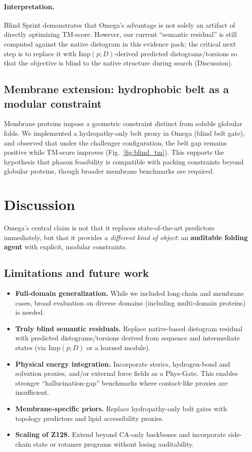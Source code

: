 \documentclass[10pt]{article}
\begin{document}
\paragraph{Interpretation.}
Blind Sprint demonstrates that Omega’s advantage is not solely an artifact of directly optimizing TM-score.
However, our current ``semantic residual'' is still computed against the native distogram in this evidence pack; the critical next step is to replace it with \(\mathrm{Imp}(p;D)\)-derived predicted distograms/torsions so that the objective is blind to the native structure during search (Discussion).

\subsection{Membrane extension: hydrophobic belt as a modular constraint}
Membrane proteins impose a geometric constraint distinct from soluble globular folds.
We implemented a hydropathy-only belt proxy in Omega (blind belt gate), and observed that under the challenger configuration, the belt gap remains positive while TM-score improves (Fig.~\ref{fig:blind_tm}).
This supports the hypothesis that phason feasibility is compatible with packing constraints beyond globular proteins, though broader membrane benchmarks are required.

\section{Discussion}
Omega’s central claim is not that it replaces state-of-the-art predictors immediately, but that it provides a \emph{different kind of object}: an \textbf{auditable folding agent} with explicit, modular constraints.

\subsection*{Limitations and future work}
\begin{itemize}[leftmargin=*]
\item \textbf{Full-domain generalization.} While we included long-chain and membrane cases, broad evaluation on diverse domains (including multi-domain proteins) is needed.
\item \textbf{Truly blind semantic residuals.} Replace native-based distogram residual with predicted distograms/torsions derived from sequence and intermediate states (via \(\mathrm{Imp}(p;D)\) or a learned module).
\item \textbf{Physical energy integration.} Incorporate sterics, hydrogen-bond and solvation proxies, and/or external force fields as a Phys-Gate. This enables stronger ``hallucination-gap'' benchmarks where contact-like proxies are insufficient.
\item \textbf{Membrane-specific priors.} Replace hydropathy-only belt gates with topology predictors and lipid accessibility proxies.
\item \textbf{Scaling of Z128.} Extend beyond CA-only backbones and incorporate side-chain state or rotamer programs without losing auditability.
\end{itemize}
\end{document}
